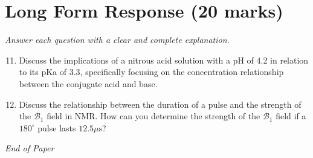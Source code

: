 \documentclass[12pt]{article}
\begin{document}
\section*{Long Form Response (20 marks)}
\textit{Answer each question with a clear and complete explanation.}
\begin{enumerate}[label=\arabic*.]
\setcounter{enumi}{10}
\item Discuss the implications of a nitrous acid solution with a pH of 4.2 in relation to its
pKa of 3.3, specifically focusing on the concentration relationship between the conjugate
acid and base.
\item Discuss the relationship between the duration of a pulse and the strength of the
$\mathscr{B}_1$ field in NMR. How can you determine the strength of the $\mathscr{B}_1$
field if a $180^{\circ}$ pulse lasts $12.5 \mu \mathrm{s}$?
\end{enumerate}

\vfill
\noindent\textit{End of Paper}
\end{document}
